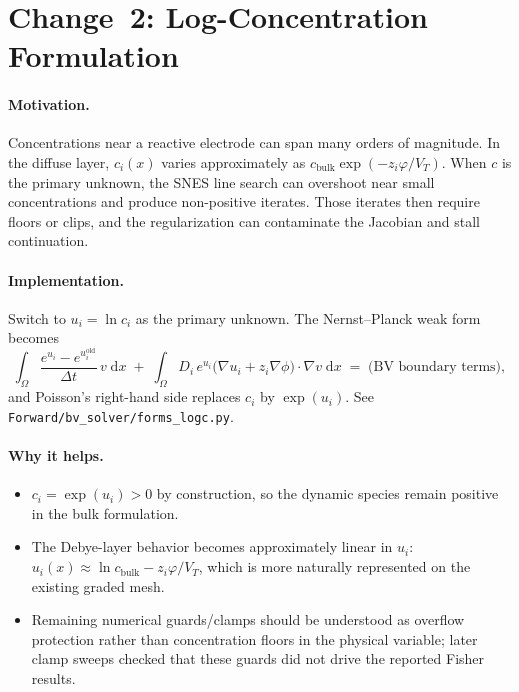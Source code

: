 \documentclass[11pt]{article}
\newcommand{\VT}{V_{T}}
\begin{document}
\section{Change~2: Log-Concentration Formulation}
\paragraph{Motivation.}
Concentrations near a reactive electrode can span many orders of magnitude. In
the diffuse layer, $c_i(x)$ varies approximately as
$c_{\mathrm{bulk}}\exp(-z_i\varphi/\VT)$. When $c$ is the primary unknown, the
SNES line search can overshoot near small concentrations and produce
non-positive iterates. Those iterates then require floors or clips, and the
regularization can contaminate the Jacobian and stall continuation.

\paragraph{Implementation.}
Switch to $u_i = \ln c_i$ as the primary unknown. The Nernst--Planck weak form
becomes
\begin{equation}
  \int_\Omega
    \frac{e^{u_i} - e^{u_i^{\mathrm{old}}}}{\Delta t}\,v\;\mathrm{d}x
  \;+\;
  \int_\Omega
    D_i\,e^{u_i}\bigl(\nabla u_i + z_i \nabla\phi\bigr)\!\cdot\!\nabla v\;\mathrm{d}x
  \;=\;
  \text{(BV boundary terms)},
\end{equation}
and Poisson's right-hand side replaces $c_i$ by $\exp(u_i)$. See
\texttt{Forward/bv\_solver/forms\_logc.py}.

\paragraph{Why it helps.}
\begin{itemize}
  \item $c_i = \exp(u_i) > 0$ by construction, so the dynamic species remain
        positive in the bulk formulation.
  \item The Debye-layer behavior becomes approximately linear in $u_i$:
        $u_i(x) \approx \ln c_{\mathrm{bulk}} - z_i\varphi/\VT$, which is more
        naturally represented on the existing graded mesh.
  \item Remaining numerical guards/clamps should be understood as overflow
        protection rather than concentration floors in the physical variable;
        later clamp sweeps checked that these guards did not drive the reported
        Fisher results.
\end{itemize}
\end{document}
